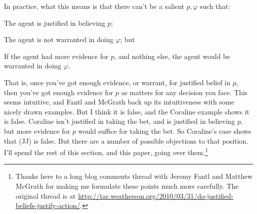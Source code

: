 \noindent In practice, what this means is that there can't be a salient $p, \varphi$ such that:

\begin{itemize*}
\item The agent is justified in believing $p$;
\item The agent is not warranted in doing $\varphi$; but
\item If the agent had more evidence for $p$, and nothing else, the agent would be warranted in doing $\varphi$.
\end{itemize*}

\noindent That is, once you've got enough evidence, or warrant, for justified belief in $p$, then you've got enough evidence for $p$ as matters for any decision you face. This seems intuitive, and Fantl and McGrath back up its intuitiveness with some nicely drawn examples. But I think it is false, and the Coraline example shows it is false. Coraline isn't justified in taking the bet, and is justified in believing $p$, but more evidence for $p$ would suffice for taking the bet. So Coraline's case shows that (JJ) is false. But there are a number of possible objections to that position. I'll spend the rest of this section, and this paper, going over them.\footnote{Thanks here to a long blog comments thread with Jeremy Fantl and Matthew McGrath for making me formulate these points much more carefully. The original thread is at \url{http://tar.weatherson.org/2010/03/31/do-justified-beliefs-justify-action/}.}


